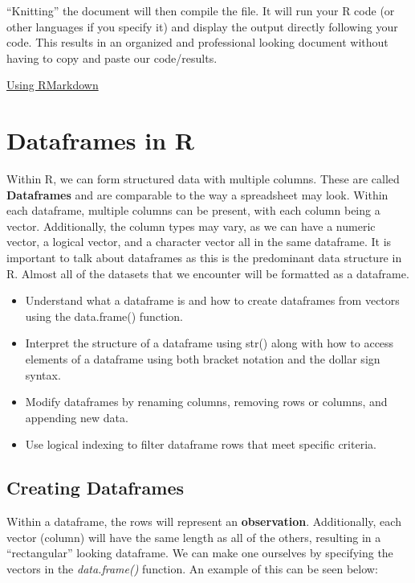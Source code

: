 \documentclass[
  letterpaper,
  DIV=11,
  numbers=noendperiod]{scrreprt}
\providecommand{\tightlist}{%
  \setlength{\itemsep}{0pt}\setlength{\parskip}{0pt}}
\begin{document}
``Knitting'' the document will then compile the file. It will run your R
code (or other languages if you specify it) and display the output
directly following your code. This results in an organized and
professional looking document without having to copy and paste our
code/results.

\begin{watch}{}{}
    \href{https://youtu.be/Sm6aMty-xiE}{Using RMarkdown}
\end{watch}


\chapter{Dataframes in R}\label{dataframes-in-r}

Within R, we can form structured data with multiple columns. These are
called \textbf{Dataframes} and are comparable to the way a spreadsheet
may look. Within each dataframe, multiple columns can be present, with
each column being a vector. Additionally, the column types may vary, as
we can have a numeric vector, a logical vector, and a character vector
all in the same dataframe. It is important to talk about dataframes as
this is the predominant data structure in R. Almost all of the datasets
that we encounter will be formatted as a dataframe.

\begin{itemize}
\tightlist
\item
  Understand what a dataframe is and how to create dataframes from
  vectors using the data.frame() function.
\item
  Interpret the structure of a dataframe using str() along with how to
  access elements of a dataframe using both bracket notation and the
  dollar sign syntax.
\item
  Modify dataframes by renaming columns, removing rows or columns, and
  appending new data.
\item
  Use logical indexing to filter dataframe rows that meet specific
  criteria.
\end{itemize}

\section{Creating Dataframes}\label{creating-dataframes}

Within a dataframe, the rows will represent an \textbf{observation}.
Additionally, each vector (column) will have the same length as all of
the others, resulting in a ``rectangular'' looking dataframe. We can
make one ourselves by specifying the vectors in the \emph{data.frame()}
function. An example of this can be seen below:
\end{document}
